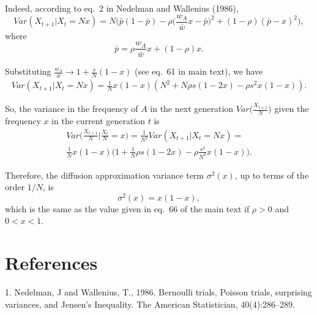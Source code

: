 \documentclass[11pt, oneside]{article}   	%
\begin{document}
Indeed, according to eq.~2 in Nedelman and Wallenius (1986), 
\begin{equation}
Var(X_{t+1}|X_t=Nx) = 
N \Big(\bar{p} (1-\bar{p}) - \rho\Big(\frac{w_A}{\bar{w}} x - \bar{p}\Big)^2 + (1-\rho)(\bar{p} - x)^2\Big),
\end{equation}
where
\begin{equation}
\bar{p} = \rho \frac{w_A}{\bar{w}} x + (1-\rho) x.
\end{equation}

Substituting $\frac{w_A}{\bar{w}} \to 1+\frac{s}{N}(1-x)$ (see eq.~61 in main text), we have
\begin{align}
Var(X_{t+1}|X_t=Nx) = 
\frac{1}{N} x (1-x) (N^2 + N \rho s (1-2x) - \rho s^2 x (1-x)).
\end{align}

So, the variance in the frequency of $A$ in the next generation $Var\Big(\frac{X_{t+1}}{N}\Big)$ given the frequency $x$ in the current generation $t$ is
\begin{multline}
Var\Big(\frac{X_{t+1}}{N} \Big| \frac{X_{t}}{N} = x\Big) = 
\frac{1}{N^2}Var(X_{t+1}|X_t=Nx) = \\
\frac{1}{N} x (1-x) \Big(1 + \frac{1}{N} \rho s (1-2x) - \rho \frac{s^2}{N^2} x (1-x)\Big).
\end{multline}


Therefore, the diffusion approximation variance term $\sigma^2(x)$, up to terms of the order $1/N$, is
\begin{equation}
\sigma^2(x) = x(1-x),
\end{equation}
which is the same as the value given in eq.~66 of the main text if $\rho>0$ and $0<x<1$. 

\section*{References}

1.  Nedelman, J and Wallenius, T., 1986. Bernoulli trials, Poisson trials, surprising variances, and Jensen’s Inequality. The American Statistician, 40(4):286–289.
\end{document}
